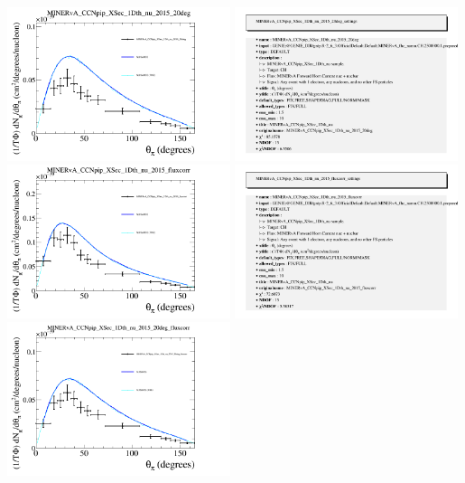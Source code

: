 \documentclass{article}
\begin{document}
\centering
\includegraphics[width=0.49\textwidth]{figures/nuisance_MINERvA_CCNpip_XSec_1Dth_nu_2015_20deg_comp.png}
\includegraphics[width=0.49\textwidth]{figures/nuisance_MINERvA_CCNpip_XSec_1Dth_nu_2015_20deg_info.png}
\centering
\includegraphics[width=0.49\textwidth]{figures/nuisance_MINERvA_CCNpip_XSec_1Dth_nu_2015_fluxcorr_comp.png}
\includegraphics[width=0.49\textwidth]{figures/nuisance_MINERvA_CCNpip_XSec_1Dth_nu_2015_fluxcorr_info.png}
\centering
\includegraphics[width=0.49\textwidth]{figures/nuisance_MINERvA_CCNpip_XSec_1Dth_nu_2015_20deg_fluxcorr_comp.png}
\end{document}
